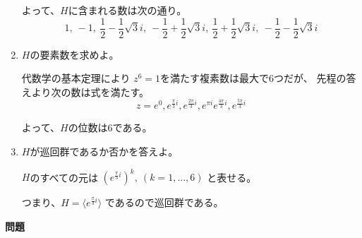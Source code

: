 \documentclass[12pt,b5paper]{ltjsarticle}
\begin{document}
\begin{enumerate}
      よって、$H$に含まれる数は次の通り。
      \begin{equation}
       1,\ -1,\ 
        \frac{1}{2}-\frac{1}{2}\sqrt{3}i,\
        -\frac{1}{2}+\frac{1}{2}\sqrt{3}i,\
        \frac{1}{2}+\frac{1}{2}\sqrt{3}i,\
        -\frac{1}{2}-\frac{1}{2}\sqrt{3}i
      \end{equation}

\hrulefill
 \item
      $H$の要素数を求めよ。

\dotfill

      代数学の基本定理により
      $z^6=1$を満たす複素数は最大で6つだが、
      先程の答えより次の数は式を満たす。
      \begin{equation}
       z=
        e^{0},e^{\frac{\pi}{3}i},e^{\frac{2\pi}{3}i},
        e^{\pi i}e^{\frac{4\pi}{3}i},e^{\frac{5\pi}{3}i}
      \end{equation}

      よって、$H$の位数は6である。

\hrulefill
 \item
      $H$が巡回群であるか否かを答えよ。

      \dotfill

      $H$のすべての元は
      $(e^{\frac{\pi}{3}i})^k,\ (k=1,\dots,6)$
      と表せる。

      つまり、$H=\langle e^{\frac{\pi}{3}i} \rangle$
      であるので巡回群である。

      \hrulefill
\end{enumerate}


\hrulefill
\textbf{問題}
\hrulefill
\end{document}
